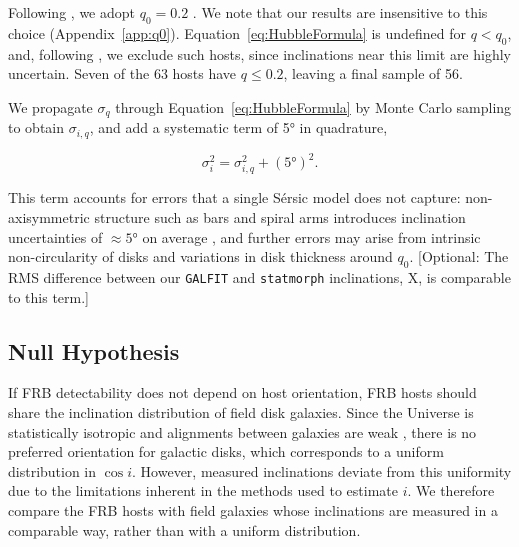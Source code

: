 \documentclass[apjl, linenumbers]{aastex701}
\begin{document}
Following \citet{Bhardwaj2024}, we adopt $q_0 = 0.2$
\citep{vandenBergh1988}. We note that our results are insensitive to this choice (Appendix~\ref{app:q0}). Equation~\ref{eq:HubbleFormula} is undefined for $q < q_0$, and, following \citet{Japelij2018}, we exclude such hosts, since inclinations near this limit are highly uncertain. Seven of the 63 hosts have $q \leq 0.2$, leaving a final sample of 56.

We propagate $\sigma_q$ through Equation~\ref{eq:HubbleFormula} by Monte Carlo sampling to obtain $\sigma_{i,q}$, and add a systematic term of \ang{5} in quadrature, 

\begin{equation} \label{eq:InclinationSystematic}
\sigma_i^2 = \sigma_{i,q}^2 + (\ang{5})^2.
\end{equation}

This term accounts for errors that a single S\'ersic model does not capture: non-axisymmetric structure such as bars and spiral arms introduces inclination uncertainties of $\approx\ang{5}$ on average \citep{Barnes2003}, and further errors may arise from intrinsic non-circularity of disks \citep{Ryden2004} and variations in disk thickness around $q_0$. [Optional: The RMS difference between our \texttt{GALFIT} and \texttt{statmorph} inclinations, X\arcdeg, is comparable to this term.] 

\subsection{Null Hypothesis} \label{sec:control}

If FRB detectability does not depend on host orientation, FRB hosts should share the inclination distribution of field disk galaxies. Since the Universe is statistically isotropic \citep{Saadeh2016} and alignments between galaxies are weak \citep{Joachimi2015J}, there is no preferred orientation for galactic disks, which corresponds to a uniform distribution in $\cos i$. However, measured inclinations deviate from this uniformity due to the limitations inherent in the methods used to estimate $i$. We therefore compare the FRB hosts with field galaxies whose inclinations are measured in a comparable way, rather than with a uniform distribution.
\end{document}
